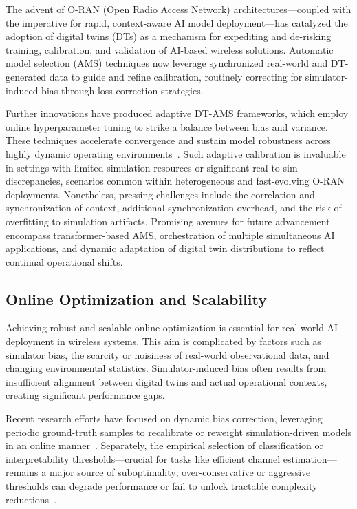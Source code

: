 \documentclass[sigconf]{acmart}
\begin{document}
The advent of O-RAN (Open Radio Access Network) architectures—coupled with the imperative for rapid, context-aware AI model deployment—has catalyzed the adoption of digital twins (DTs) as a mechanism for expediting and de-risking training, calibration, and validation of AI-based wireless solutions. Automatic model selection (AMS) techniques now leverage synchronized real-world and DT-generated data to guide and refine calibration, routinely correcting for simulator-induced bias through loss correction strategies.

Further innovations have produced adaptive DT-AMS frameworks, which employ online hyperparameter tuning to strike a balance between bias and variance. These techniques accelerate convergence and sustain model robustness across highly dynamic operating environments~\cite{ref37}. Such adaptive calibration is invaluable in settings with limited simulation resources or significant real-to-sim discrepancies, scenarios common within heterogeneous and fast-evolving O-RAN deployments. Nonetheless, pressing challenges include the correlation and synchronization of context, additional synchronization overhead, and the risk of overfitting to simulation artifacts. Promising avenues for future advancement encompass transformer-based AMS, orchestration of multiple simultaneous AI applications, and dynamic adaptation of digital twin distributions to reflect continual operational shifts.

\subsection{Online Optimization and Scalability}

Achieving robust and scalable online optimization is essential for real-world AI deployment in wireless systems. This aim is complicated by factors such as simulator bias, the scarcity or noisiness of real-world observational data, and changing environmental statistics. Simulator-induced bias often results from insufficient alignment between digital twins and actual operational contexts, creating significant performance gaps.

Recent research efforts have focused on dynamic bias correction, leveraging periodic ground-truth samples to recalibrate or reweight simulation-driven models in an online manner~\cite{ref37,ref38}. Separately, the empirical selection of classification or interpretability thresholds—crucial for tasks like efficient channel estimation—remains a major source of suboptimality; over-conservative or aggressive thresholds can degrade performance or fail to unlock tractable complexity reductions~\cite{ref41}.
\end{document}
